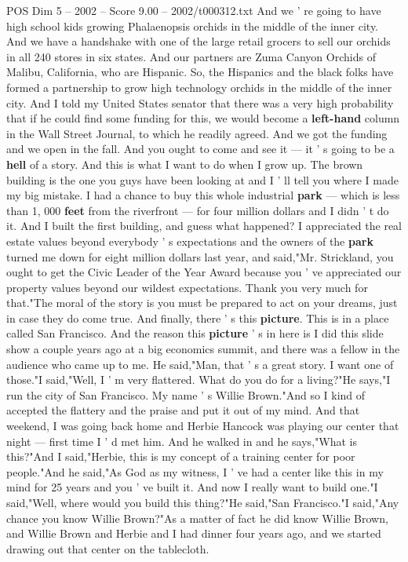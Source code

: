 \begin{textsample}{POS Dim 5 – 2002 – Score 9.00 – 2002/t000312.txt}
And we ' re going to have high school kids growing Phalaenopsis orchids in the middle of the inner city.
And we have a handshake with one of the large retail grocers to sell our orchids in all 240 stores in six states.
And our partners are Zuma Canyon Orchids of Malibu, California, who are Hispanic.
So, the Hispanics and the black folks have formed a partnership to grow high technology orchids in the middle of the inner city.
And I told my United States senator that there was a very high probability that if he could find some funding for this, we would become a \textbf{left-hand} column in the Wall Street Journal, to which he readily agreed.
And we got the funding and we open in the fall.
And you ought to come and see it — it ' s going to be a \textbf{hell} of a story.
And this is what I want to do when I grow up.
The brown building is the one you guys have been looking at and I ' ll tell you where I made my big mistake.
I had a chance to buy this whole industrial \textbf{park} — which is less than 1, 000 \textbf{feet} from the riverfront — for four million dollars and I didn ' t do it.
And I built the first building, and guess what happened?
I appreciated the real estate values beyond everybody ' s expectations and the owners of the \textbf{park} turned me down for eight million dollars last year, and said,"Mr.
Strickland, you ought to get the Civic Leader of the Year Award because you ' ve appreciated our property values beyond our wildest expectations.
Thank you very much for that."The moral of the story is you must be prepared to act on your dreams, just in case they do come true.
And finally, there ' s this \textbf{picture}.
This is in a place called San Francisco.
And the reason this \textbf{picture} ' s in here is I did this slide show a couple years ago at a big economics summit, and there was a fellow in the audience who came up to me.
He said,"Man, that ' s a great story.
I want one of those."I said,"Well, I ' m very flattered.
What do you do for a living?"He says,"I run the city of San Francisco.
My name ' s Willie Brown."And so I kind of accepted the flattery and the praise and put it out of my mind.
And that weekend, I was going back home and Herbie Hancock was playing our center that night — first time I ' d met him.
And he walked in and he says,"What is this?"And I said,"Herbie, this is my concept of a training center for poor people."And he said,"As God as my witness, I ' ve had a center like this in my mind for 25 years and you ' ve built it.
And now I really want to build one."I said,"Well, where would you build this thing?"He said,"San Francisco."I said,"Any chance you know Willie Brown?"As a matter of fact he did know Willie Brown, and Willie Brown and Herbie and I had dinner four years ago, and we started drawing out that center on the tablecloth.

\end{textsample}
